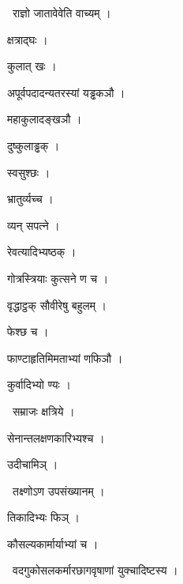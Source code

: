 \documentclass[10pt, openany, oneside]{book}
\begin{document}
\par\noindent\hspace{1.5em}{\vps वा॰}~{\qt राज्ञो जातावेवेति वाच्यम् ।}

\noindent क्षत्राद्घः ।

\noindent कुलात् खः ।

\noindent अपूर्वपदादन्यतरस्यां यड्ढकञौ ।

\noindent महाकुलादङ्खञौ ।

\noindent दुष्कुलाड्ढक् ।

\noindent स्वसुश्छः ।

\noindent भ्रातुर्व्यच्च ।

\noindent व्यन् सपत्ने ।

\noindent रेवत्यादिभ्यष्ठक् ।

\noindent गोत्रस्त्रियाः कुत्सने ण च ।

\noindent वृद्धाट्ठक् सौवीरेषु बहुलम् ।

\noindent फेश्छ च ।

\noindent फाण्टाहृतिमिमताभ्यां णफिञौ ।

\noindent कुर्वादिभ्यो ण्यः ।

\par\noindent\hspace{1.5em}{\vps वा॰}~{\qt सम्राजः क्षत्रिये ।}

\noindent सेनान्तलक्षणकारिभ्यश्च ।

\noindent उदीचामिञ् ।

\par\noindent\hspace{1.5em}{\vps वा॰}~{\qt तक्ष्णोऽण उपसंख्यानम् ।}

\noindent तिकादिभ्यः फिञ् ।

\noindent कौसल्यकार्मार्याभ्यां च ।

\par\noindent\hspace{1.5em}{\vps वा॰}~{\qt वदगुकोसलकर्मारछागवृषाणां युक्चादिष्टस्य ।}
\end{document}
